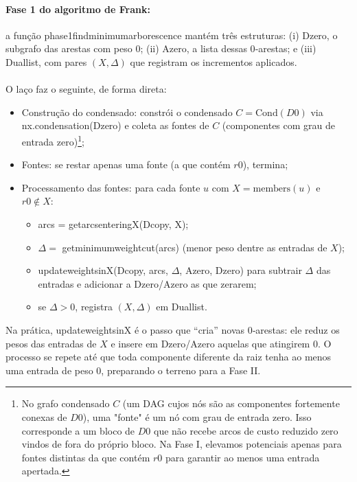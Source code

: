 \documentclass[12pt,a4paper]{article}
\def\texttt#1{#1}%
\def\emph#1{#1}%
\def\_{}%
\begin{document}
\paragraph{Fase 1 do algoritmo de Frank:}
	a função \texttt{phase1\_find\_minimum\_arborescence} mantém três estruturas: (i) \texttt{D\_zero}, o subgrafo das arestas com peso 0; (ii) \texttt{A\_zero}, a lista dessas 0‑arestas; e (iii) \texttt{Dual\_list}, com pares \((X,\Delta)\) que registram os incrementos aplicados.

\paragraph{}
O laço faz o seguinte, de forma direta:
\begin{itemize}
    \item \emph{Construção do condensado:} constrói o condensado \(C=\mathrm{Cond}(D\_0)\) via \texttt{nx.condensation(D\_zero)} e coleta as \emph{fontes} de \(C\) (componentes com grau de entrada zero)\footnote{No grafo condensado \(C\) (um DAG cujos nós são as componentes fortemente conexas de \(D\_0\)), uma "fonte" é um nó com grau de entrada zero. Isso corresponde a um bloco de \(D\_0\) que não recebe arcos de custo reduzido zero vindos de fora do próprio bloco. Na Fase I, elevamos potenciais apenas para fontes distintas da que contém \(r\_0\) para garantir ao menos uma entrada apertada.};
    \item \emph{Fontes:} se restar apenas uma fonte (a que contém \(r0\)), termina;
    \item \emph{Processamento das fontes:} para cada fonte \(u\) com \(X=\text{members}(u)\) e \(r0\notin X\):
    \begin{itemize}
        \item \texttt{arcs = get\_arcs\_entering\_X(D\_copy, X)};
        \item \(\Delta =\) \texttt{get\_minimum\_weight\_cut(arcs)} (menor peso dentre as entradas de \(X\));
        \item \texttt{update\_weights\_in\_X(D\_copy, arcs, \(\Delta\), A\_zero, D\_zero)} para subtrair \(\Delta\) das entradas e adicionar a \texttt{D\_zero}/\texttt{A\_zero} as que zerarem;
        \item se \(\Delta>0\), registra \((X,\Delta)\) em \texttt{Dual\_list}.
    \end{itemize}
\end{itemize}

Na prática, \texttt{update\_weights\_in\_X} é o passo que “cria” novas 0‑arestas: ele reduz os pesos das entradas de \(X\) e insere em \texttt{D\_zero}/\texttt{A\_zero} aquelas que atingirem 0. O processo se repete até que toda componente diferente da raiz tenha ao menos uma entrada de peso 0, preparando o terreno para a Fase II.
\end{document}

